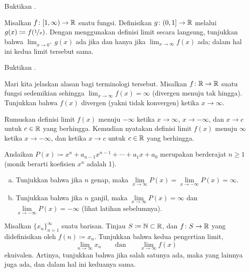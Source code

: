 \begin{exercise}
Buktikan .
\end{exercise}

\begin{exercise}
Misalkan $f \colon [1,\infty) \to {\mathbb{R}}$ suatu fungsi.  Definisikan
$g \colon (0,1] \to {\mathbb{R}}$ melalui $g(x) \coloneqq f(\nicefrac{1}{x})$.
Dengan menggunakan definisi limit secara langsung,
tunjukkan bahwa $\lim_{x\to 0^+} g(x)$
ada jika dan hanya jika $\lim_{x\to \infty} f(x)$ ada; dalam
hal ini kedua limit tersebut sama.
\end{exercise}

\begin{exercise}
Buktikan .
\end{exercise}

\begin{exercise}
Mari kita jelaskan alasan bagi terminologi tersebut.
Misalkan $f \colon {\mathbb{R}} \to {\mathbb{R}}$ suatu fungsi sedemikian sehingga
$\lim_{x \to \infty} f(x) = \infty$ (divergen menuju tak hingga).
Tunjukkan bahwa $f(x)$ divergen (yakni tidak konvergen) ketika $x \to \infty$.
\end{exercise}

\begin{exercise}
Rumuskan definisi limit $f(x)$ menuju $-\infty$ ketika $x \to
\infty$, $x \to -\infty$, dan $x \to c$ untuk $c \in {\mathbb{R}}$ yang berhingga.
Kemudian nyatakan definisi limit $f(x)$ menuju $\infty$ 
ketika $x \to -\infty$, dan ketika $x \to c$ untuk $c \in {\mathbb{R}}$ yang berhingga.
\end{exercise}

\begin{exercise}
Andaikan $P(x) \coloneqq x^n + a_{n-1} x^{n-1} + \cdots + a_1 x + a_0$ merupakan \emph{}
berderajat $n \geq 1$ (monik berarti koefisien $x^n$ adalah 1).
\begin{enumerate}[a)]
\item
Tunjukkan bahwa jika $n$ genap, maka $\lim\limits_{x\to\infty} P(x) = 
\lim\limits_{x\to-\infty} P(x) = \infty$.
\item
Tunjukkan bahwa jika $n$ ganjil, maka
$\lim\limits_{x\to\infty} P(x) = \infty$ dan
$\lim\limits_{x\to-\infty} P(x) = -\infty$ (lihat latihan sebelumnya).
\end{enumerate}
\end{exercise}

\begin{exercise}
Misalkan $\{ x_n \}_{n=1}^\infty$ suatu barisan.  Tinjau $S \coloneqq {\mathbb{N}} \subset {\mathbb{R}}$, dan
$f \colon S \to {\mathbb{R}}$ yang didefinisikan oleh $f(n) \coloneqq x_n$.  Tunjukkan bahwa
kedua pengertian limit,
\begin{equation*}
\lim_{n\to\infty} x_n \qquad \text{dan} \qquad
\lim_{x\to\infty} f(x) 
\end{equation*}
ekuivalen.  Artinya, tunjukkan bahwa jika salah satunya ada, maka
yang lainnya juga ada, dan dalam hal ini keduanya sama.
\end{exercise}

